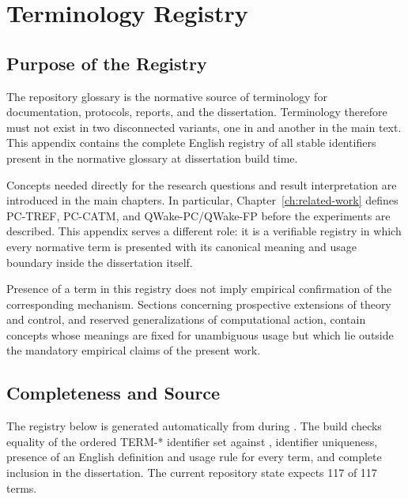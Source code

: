 \chapter{Terminology Registry}
\label{app:terminology-en}

\section{Purpose of the Registry}

The repository glossary is the normative source of terminology for documentation,
protocols, reports, and the dissertation. Terminology therefore must not exist in two
disconnected variants, one in  and another in the main
text. This appendix contains the complete English registry of all stable
 identifiers present in the normative glossary at dissertation build
time.

Concepts needed directly for the research questions and result interpretation are
introduced in the main chapters. In particular, Chapter~\ref{ch:related-work}
defines PC-TREF, PC-CATM, and QWake-PC/QWake-FP before the experiments are
described. This appendix serves a different role: it is a verifiable registry in
which every normative term is presented with its canonical meaning and usage
boundary inside the dissertation itself.

Presence of a term in this registry does not imply empirical confirmation of the
corresponding mechanism. Sections concerning prospective extensions of theory and
control, and reserved generalizations of computational action, contain concepts
whose meanings are fixed for unambiguous usage but which lie outside the mandatory
empirical claims of the present work.

\section{Completeness and Source}

The registry below is generated automatically from 
during . The build checks equality of the ordered TERM-* identifier
set against , identifier uniqueness, presence of an English
definition and usage rule for every term, and complete inclusion in the dissertation.
The current repository state expects 117 of 117 terms.


